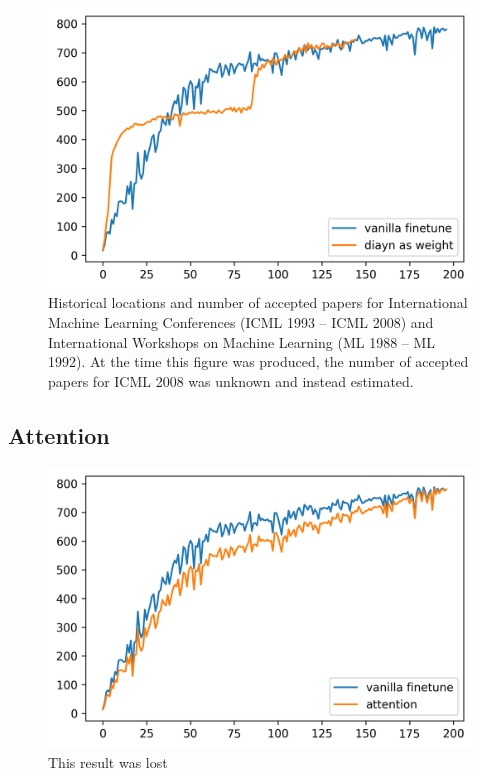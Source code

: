 \begin{figure}[ht]
  \vskip 0.2in
  \begin{center}
  \centerline{\includegraphics[width=\columnwidth]{Figures/diayn_as_skill_on_walker_run.png}}
  \caption{Historical locations and number of accepted papers for International
  Machine Learning Conferences (ICML 1993 -- ICML 2008) and International
  Workshops on Machine Learning (ML 1988 -- ML 1992). At the time this figure was
  produced, the number of accepted papers for ICML 2008 was unknown and instead
  estimated.}
  \label{diayn-as-skill-weight}
  \end{center}
  \vskip -0.2in
  \end{figure}

\subsection{Attention}
\begin{figure}[ht]
  \vskip 0.2in
  \begin{center}
  \centerline{\includegraphics[width=\columnwidth]{Figures/attention_on_walker_run.png}}
  \caption{This result was lost}
  \label{attention-on-walker-run}
  \end{center}
  \vskip -0.2in
  \end{figure}

